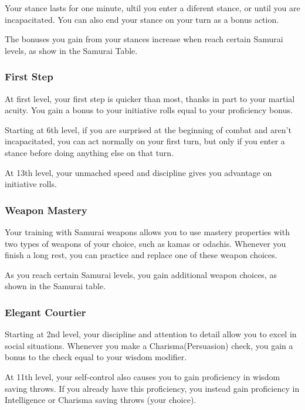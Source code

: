 \documentclass[letterpaper,twocolumn,openany,nodeprecatedcode]{dndbook}
\begin{document}
\noindent Your stance lasts for one minute, ultil you enter a diferent stance, or until you are incapacitated. You can also
end your stance on your turn as a bonus action.

\noindent The bonuses you gain from your stances increase when reach certain Samurai levels, as show in the Samurai Table.

\subsubsection{First Step}
At first level, your first step is quicker than most, thanks in part to your martial acuity. You gain a bonus to
your initiative rolls equal to your proficiency bonus.
\vspace{\baselineskip}

\noindent Starting at 6th level, if you are surprised at the beginning of combat and aren't incapacitated, you can act 
normally on your first turn, but only if you enter a stance before doing anything else on that turn.
\vspace{\baselineskip}

\noindent At 13th level, your unmached speed and discipline gives you advantage on initiative rolls.

\subsubsection{Weapon Mastery}
Your training with Samurai weapons allows you to use mastery properties with two types of weapons of your choice, 
such as kamas or odachis. Whenever you finish a long rest, you can practice and replace one of these weapon choices.

\noindent As you reach certain Samurai levels, you gain additional weapon choices, as shown in the Samurai table.

\newpage
\subsubsection{Elegant Courtier}
Starting at 2nd level, your discipline and attention to detail allow you to excel in social situations. Whenever you 
make a Charisma(Persuasion) check, you gain a bonus to the check equal to your wisdom modifier.
\vspace{\baselineskip}

\noindent At 11th level, your self-control also causes you to gain proficiency in wisdom saving throws. If you already have this
proficiency, you instead gain proficiency in Intelligence or Charisma saving throws (your choice). 
\end{document}

